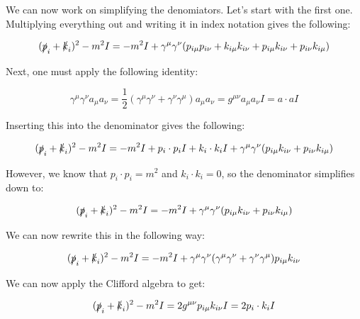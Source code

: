 \documentclass[a4]{article}
\begin{document}
    We can now work on simplifying the denomiators. Let's start with the first one. Multiplying everything out and writing it in index notation gives the following:

    \begin{equation}
        (\slashed{p}_i + \slashed{k}_i)^2 - m^2 I = - m^2 I + \gamma^{\mu} \gamma^{\nu} (p_{i \mu} p_{i \nu} + k_{i \mu} k _{i \nu} + p_{i \mu} k_{i \nu} + p_{i \nu} k_{i \mu})
    \end{equation}

    Next, one must apply the following identity:

    \begin{equation}
        \gamma^{\mu} \gamma^{\nu} a_{\mu} a_{\nu} = \frac{1}{2} (\gamma^{\mu} \gamma^{\nu} + \gamma^{\nu} \gamma^{\mu}) a_{\mu} a_{\nu} = g^{\mu \nu} a_{\mu} a_{\nu} I = a \cdot a I
    \end{equation}

    Inserting this into the denominator gives the following: 

    \begin{equation}
        (\slashed{p}_i + \slashed{k}_i)^2 - m^2 I = - m^2 I + p_i \cdot p_i I + k_i \cdot k_i I + \gamma^{\mu} \gamma^{\nu} (p_{i \mu} k_{i \nu} + p_{i \nu} k_{i \mu})
    \end{equation}

    However, we know that $p_i \cdot p_i = m^2$ and $k_i \cdot k_i = 0$, so the denominator simplifies down to:

    \begin{equation}
        (\slashed{p}_i + \slashed{k}_i)^2 - m^2 I = - m^2 I + \gamma^{\mu} \gamma^{\nu} (p_{i \mu} k_{i \nu} + p_{i \nu} k_{i \mu})
    \end{equation}

    We can now rewrite this in the following way:

    \begin{equation}
        (\slashed{p}_i + \slashed{k}_i)^2 - m^2 I = - m^2 I + \gamma^{\mu} \gamma^{\nu} (\gamma^{\mu} \gamma^{\nu} + \gamma^{\nu} \gamma^{\mu}) p_{i \mu} k_{i \nu}
    \end{equation}

    We can now apply the Clifford algebra to get:

    \begin{equation}
        (\slashed{p}_i + \slashed{k}_i)^2 - m^2 I = 2 g^{\mu \nu} p_{i \mu} k_{i \nu} I = 2 p_i \cdot k_i I
    \end{equation}
\end{document}
